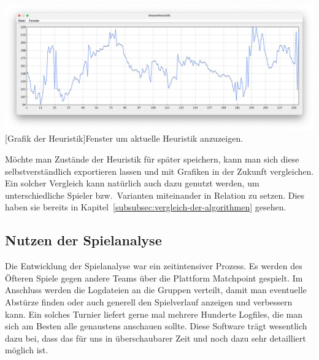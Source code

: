 \vspace{1em}
\begin{minipage}{\linewidth}
    \centering
    \includegraphics[width=0.8\linewidth]{pics/heuristic}
    [Grafik der Heuristik]{Fenster um aktuelle Heuristik anzuzeigen.}
    \label{fig:heuristic}
\end{minipage}

M\"ochte man Zust\"ande der Heuristik f\"ur sp\"ater speichern, kann man sich diese selbstverst\"andlich exportieren lassen und mit Grafiken in der Zukunft vergleichen.
Ein solcher Vergleich kann nat\"urlich auch dazu genutzt werden, um unterschiedliche Spieler bzw.\ Varianten miteinander in Relation zu setzen.
Dies haben sie bereits in Kapitel~\ref{subsubsec:vergleich-der-algorithmen} gesehen.

\subsection{Nutzen der Spielanalyse}\label{subsec:nutzen-der-spielanalyse}
Die Entwicklung der Spielanalyse war ein zeitintensiver Prozess.
Es werden des \"Ofteren Spiele gegen andere Teams \"uber die Plattform Matchpoint gespielt.
Im Anschluss werden die Logdateien an die Gruppen verteilt, damit man eventuelle Abst\"urze finden oder auch generell den Spielverlauf anzeigen und verbessern kann.
Ein solches Turnier liefert gerne mal mehrere Hunderte Logfiles, die man sich am Besten alle genaustens anschauen sollte.
Diese Software tr\"agt wesentlich dazu bei, dass das f\"ur uns in \"uberschaubarer Zeit und noch dazu sehr detailliert m\"oglich ist.


\bigskip
\newpage